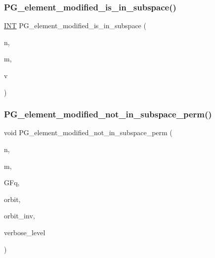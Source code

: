 \subsubsection{\texorpdfstring{P\+G\+\_\+element\+\_\+modified\+\_\+is\+\_\+in\+\_\+subspace()}{PG\_element\_modified\_is\_in\_subspace()}}
{\footnotesize\ttfamily \mbox{\hyperlink{galois_8h_a09fddde158a3a20bd2dcadb609de11dc}{I\+NT}} P\+G\+\_\+element\+\_\+modified\+\_\+is\+\_\+in\+\_\+subspace (\begin{DoxyParamCaption}\item[{\mbox{\hyperlink{galois_8h_a09fddde158a3a20bd2dcadb609de11dc}{I\+NT}}}]{n,  }\item[{\mbox{\hyperlink{galois_8h_a09fddde158a3a20bd2dcadb609de11dc}{I\+NT}}}]{m,  }\item[{\mbox{\hyperlink{galois_8h_a09fddde158a3a20bd2dcadb609de11dc}{I\+NT}} $\ast$}]{v }\end{DoxyParamCaption})}

\mbox{\label{projective_8_c_a14cfe45d125781ded8ccad7f547cebfc}} 
\subsubsection{\texorpdfstring{P\+G\+\_\+element\+\_\+modified\+\_\+not\+\_\+in\+\_\+subspace\+\_\+perm()}{PG\_element\_modified\_not\_in\_subspace\_perm()}}
{\footnotesize\ttfamily void P\+G\+\_\+element\+\_\+modified\+\_\+not\+\_\+in\+\_\+subspace\+\_\+perm (\begin{DoxyParamCaption}\item[{\mbox{\hyperlink{galois_8h_a09fddde158a3a20bd2dcadb609de11dc}{I\+NT}}}]{n,  }\item[{\mbox{\hyperlink{galois_8h_a09fddde158a3a20bd2dcadb609de11dc}{I\+NT}}}]{m,  }\item[{\mbox{\hyperlink{classfinite__field}{finite\+\_\+field}} \&}]{G\+Fq,  }\item[{\mbox{\hyperlink{galois_8h_a09fddde158a3a20bd2dcadb609de11dc}{I\+NT}} $\ast$}]{orbit,  }\item[{\mbox{\hyperlink{galois_8h_a09fddde158a3a20bd2dcadb609de11dc}{I\+NT}} $\ast$}]{orbit\+\_\+inv,  }\item[{\mbox{\hyperlink{galois_8h_a09fddde158a3a20bd2dcadb609de11dc}{I\+NT}}}]{verbose\+\_\+level }\end{DoxyParamCaption})}

